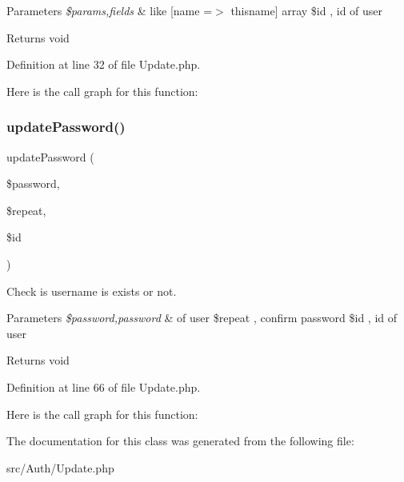 \begin{DoxyParams}{Parameters}
{\em \$params,fields} & like \mbox{[}name =$>$ thisname\mbox{]} array \$id , id of user\\
\hline
\end{DoxyParams}
\begin{DoxyReturn}{Returns}
void 
\end{DoxyReturn}


Definition at line 32 of file Update.\+php.

Here is the call graph for this function\+:
\mbox{\label{class_zest_1_1_auth_1_1_update_aeca2b4ab2b5298b4c186a17f2e5de52c}} 
\subsubsection{\texorpdfstring{update\+Password()}{updatePassword()}}
{\footnotesize\ttfamily update\+Password (\begin{DoxyParamCaption}\item[{}]{\$password,  }\item[{}]{\$repeat,  }\item[{}]{\$id }\end{DoxyParamCaption})}

Check is username is exists or not.


\begin{DoxyParams}{Parameters}
{\em \$password,password} & of user \$repeat , confirm password \$id , id of user\\
\hline
\end{DoxyParams}
\begin{DoxyReturn}{Returns}
void 
\end{DoxyReturn}


Definition at line 66 of file Update.\+php.

Here is the call graph for this function\+:


The documentation for this class was generated from the following file\+:\begin{DoxyCompactItemize}
\item 
src/\+Auth/Update.\+php\end{DoxyCompactItemize}
